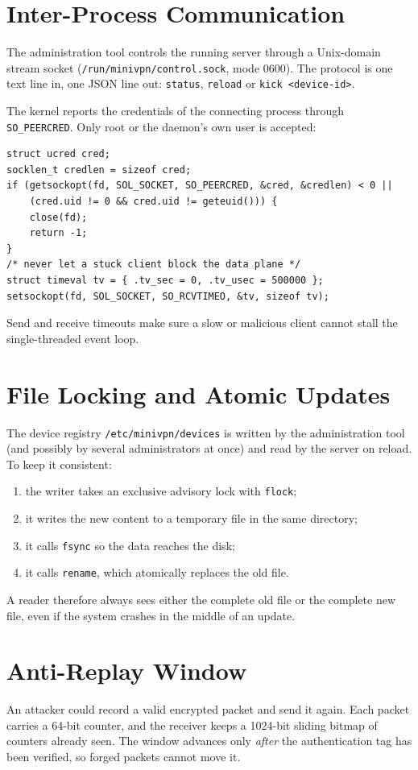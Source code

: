 \documentclass[12pt,a4paper]{report}
\begin{document}
\section{Inter-Process Communication}
The administration tool controls the running server through a Unix-domain stream socket
(\texttt{/run/minivpn/control.sock}, mode 0600). The protocol is one text line in, one
JSON line out: \texttt{status}, \texttt{reload} or \texttt{kick <device-id>}.

The kernel reports the credentials of the connecting process through
\texttt{SO\_PEERCRED}. Only root or the daemon's own user is accepted:

\begin{lstlisting}[caption={Authenticating the caller (\texttt{src/control.c})}]
struct ucred cred;
socklen_t credlen = sizeof cred;
if (getsockopt(fd, SOL_SOCKET, SO_PEERCRED, &cred, &credlen) < 0 ||
    (cred.uid != 0 && cred.uid != geteuid())) {
    close(fd);
    return -1;
}
/* never let a stuck client block the data plane */
struct timeval tv = { .tv_sec = 0, .tv_usec = 500000 };
setsockopt(fd, SOL_SOCKET, SO_RCVTIMEO, &tv, sizeof tv);
\end{lstlisting}
Send and receive timeouts make sure a slow or malicious client cannot stall the
single-threaded event loop.

\section{File Locking and Atomic Updates}
The device registry \texttt{/etc/minivpn/devices} is written by the administration tool
(and possibly by several administrators at once) and read by the server on reload. To
keep it consistent:
\begin{enumerate}
  \item the writer takes an exclusive advisory lock with \texttt{flock};
  \item it writes the new content to a temporary file in the same directory;
  \item it calls \texttt{fsync} so the data reaches the disk;
  \item it calls \texttt{rename}, which atomically replaces the old file.
\end{enumerate}
A reader therefore always sees either the complete old file or the complete new file,
even if the system crashes in the middle of an update.

\section{Anti-Replay Window}
An attacker could record a valid encrypted packet and send it again. Each packet
carries a 64-bit counter, and the receiver keeps a 1024-bit sliding bitmap of counters
already seen. The window advances only \emph{after} the authentication tag has been
verified, so forged packets cannot move it.
\end{document}
